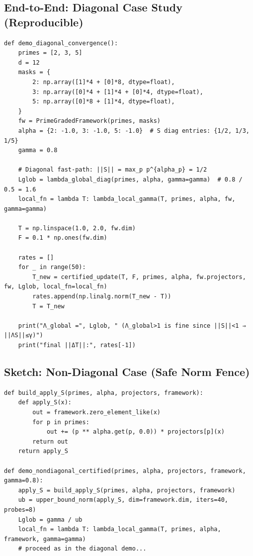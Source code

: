 \documentclass[11pt]{article}
\newcommand{\Lrec}{\Lambda_{\mathrm{rec}}}
\theoremstyle{definition}
\begin{document}
\subsection{End-to-End: Diagonal Case Study (Reproducible)}
\begin{lstlisting}[style=py,caption={Diagonal system: convergence with $\|\Lrec S\|\le\gamma$},label={lst:diagdemo}]
def demo_diagonal_convergence():
    primes = [2, 3, 5]
    d = 12
    masks = {
        2: np.array([1]*4 + [0]*8, dtype=float),
        3: np.array([0]*4 + [1]*4 + [0]*4, dtype=float),
        5: np.array([0]*8 + [1]*4, dtype=float),
    }
    fw = PrimeGradedFramework(primes, masks)
    alpha = {2: -1.0, 3: -1.0, 5: -1.0}  # S diag entries: {1/2, 1/3, 1/5}
    gamma = 0.8

    # Diagonal fast-path: ||S|| = max_p p^{alpha_p} = 1/2
    Lglob = lambda_global_diag(primes, alpha, gamma=gamma)  # 0.8 / 0.5 = 1.6
    local_fn = lambda T: lambda_local_gamma(T, primes, alpha, fw, gamma=gamma)

    T = np.linspace(1.0, 2.0, fw.dim)
    F = 0.1 * np.ones(fw.dim)

    rates = []
    for _ in range(50):
        T_new = certified_update(T, F, primes, alpha, fw.projectors, fw, Lglob, local_fn=local_fn)
        rates.append(np.linalg.norm(T_new - T))
        T = T_new

    print("Λ_global =", Lglob, " (Λ_global>1 is fine since ||S||<1 ⇒ ||ΛS||≤γ)")
    print("final ||ΔT||:", rates[-1])
\end{lstlisting}

\subsection{Sketch: Non-Diagonal Case (Safe Norm Fence)}
\begin{lstlisting}[style=py,caption={Building apply_S and fencing with a one-sided upper bound},label={lst:nondiag}]
def build_apply_S(primes, alpha, projectors, framework):
    def apply_S(x):
        out = framework.zero_element_like(x)
        for p in primes:
            out += (p ** alpha.get(p, 0.0)) * projectors[p](x)
        return out
    return apply_S

def demo_nondiagonal_certified(primes, alpha, projectors, framework, gamma=0.8):
    apply_S = build_apply_S(primes, alpha, projectors, framework)
    ub = upper_bound_norm(apply_S, dim=framework.dim, iters=40, probes=8)
    Lglob = gamma / ub
    local_fn = lambda T: lambda_local_gamma(T, primes, alpha, framework, gamma=gamma)
    # proceed as in the diagonal demo...
\end{lstlisting}
\end{document}
